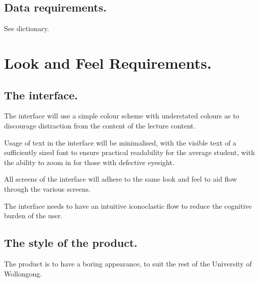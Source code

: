 



\subsection{Data requirements.}

See dictionary.


\section{Look and Feel Requirements.}

\subsection{The interface.}

The interface will use a simple colour scheme with understated colours as to discourage distraction from the content of the lecture content.

Usage of text in the interface will be minimalised, with the visible text of a sufficiently sized font to ensure practical readability for the average student, with the ability to zoom in for those with defective eyesight.

All screens of the interface will adhere to the same look and feel to aid flow through the various screens.

The interface needs to have an intuitive iconoclastic flow to reduce the cognitive burden of the user.

\subsection{The style of the product.}

The product is to have a boring appearance, to suit the rest of the University of Wollongong.

